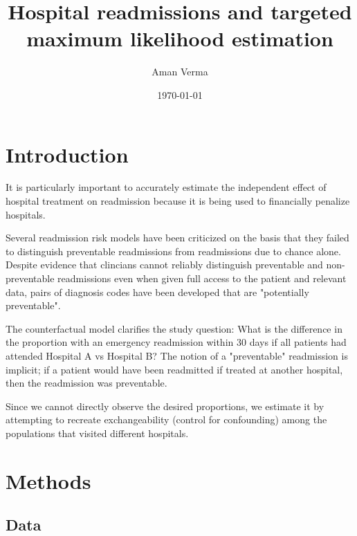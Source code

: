 \documentclass[]{article}
\begin{document}
\title{Hospital readmissions and targeted maximum likelihood estimation}
\author{Aman Verma}
\date{\today}


\section{Introduction}
It is particularly important to accurately estimate the independent effect of hospital treatment on readmission because it is being used to financially penalize hospitals.

Several readmission risk models have been criticized on the basis that they failed to distinguish preventable readmissions from readmissions due to chance alone. Despite evidence that clincians cannot reliably distinguish preventable and non-preventable readmissions even when given full access to the patient and relevant data, pairs of diagnosis codes have been developed that are "potentially preventable".

The counterfactual model clarifies the study question: What is the difference in the proportion with an emergency readmission within 30 days if all patients had attended Hospital A vs Hospital B? The notion of a "preventable" readmission is implicit; if a patient would have been readmitted if treated at another hospital, then the readmission was preventable. 

Since we cannot directly observe the desired proportions, we estimate it by attempting to recreate exchangeability (control for confounding) among the populations that visited different hospitals.



\section{Methods}

\subsection{Data}
\end{document}
